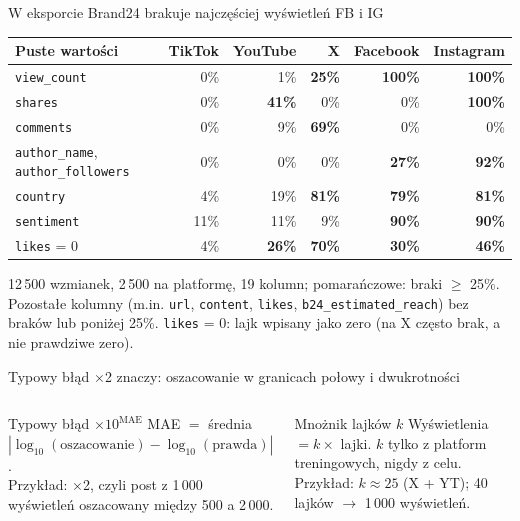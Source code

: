 \documentclass[aspectratio=169,10pt]{beamer}
\renewcommand{\x}[1]{$\times$#1}
\begin{document}
\begin{frame}{W eksporcie Brand24 brakuje najczęściej wyświetleń FB i IG}
\centering\scriptsize\setlength{\tabcolsep}{5pt}\renewcommand{\arraystretch}{1.15}
\begin{tabular}{lrrrrr}
\toprule
\textbf{Puste wartości} & TikTok & YouTube & X & Facebook & Instagram \\
\midrule
\texttt{view\_count} & 0\% & 1\% & \cellcolor{orange!35}\textbf{25\%} & \cellcolor{orange!35}\textbf{100\%} & \cellcolor{orange!35}\textbf{100\%} \\
\texttt{shares} & 0\% & \cellcolor{orange!35}\textbf{41\%} & 0\% & 0\% & \cellcolor{orange!35}\textbf{100\%} \\
\texttt{comments} & 0\% & 9\% & \cellcolor{orange!35}\textbf{69\%} & 0\% & 0\% \\
\texttt{author\_name}, \texttt{author\_followers} & 0\% & 0\% & 0\% & \cellcolor{orange!35}\textbf{27\%} & \cellcolor{orange!35}\textbf{92\%} \\
\texttt{country} & 4\% & 19\% & \cellcolor{orange!35}\textbf{81\%} & \cellcolor{orange!35}\textbf{79\%} & \cellcolor{orange!35}\textbf{81\%} \\
\texttt{sentiment} & 11\% & 11\% & 9\% & \cellcolor{orange!35}\textbf{90\%} & \cellcolor{orange!35}\textbf{90\%} \\
\midrule
\texttt{likes} = 0 & 4\% & \cellcolor{orange!35}\textbf{26\%} & \cellcolor{orange!35}\textbf{70\%} & \cellcolor{orange!35}\textbf{30\%} & \cellcolor{orange!35}\textbf{46\%} \\
\bottomrule
\end{tabular}
\vspace{6pt}

12\,500 wzmianek, 2\,500 na platformę, 19 kolumn; pomarańczowe: braki $\geq$ 25\%.
\vfill
{\scriptsize\color{mut} Pozostałe kolumny (m.in. \texttt{url}, \texttt{content}, \texttt{likes}, \texttt{b24\_estimated\_reach}) bez braków lub poniżej 25\%. \texttt{likes} = 0: lajk wpisany jako zero (na X często brak, a nie prawdziwe zero).}
\end{frame}

\begin{frame}{Typowy błąd \x{2} znaczy: oszacowanie w granicach połowy i dwukrotności}
\begin{columns}[T]
\begin{block}{Typowy błąd $\times 10^{\mathrm{MAE}}$}
\normalsize
MAE $=$ średnia $|\log_{10}(\text{oszacowanie})-\log_{10}(\text{prawda})|$.\\[3pt]
Przykład: \alert{\x{2}}, czyli post z 1\,000 wyświetleń oszacowany między 500 a 2\,000.
\end{block}
\begin{block}{Mnożnik lajków $k$}
\normalsize
Wyświetlenia $= k\times$ lajki. $k$ tylko z platform treningowych, nigdy z celu.\\[3pt]
Przykład: $k\approx 25$ (X + YT); 40 lajków $\to$ 1\,000 wyświetleń.
\end{block}
\end{columns}
\end{frame}
\end{document}
